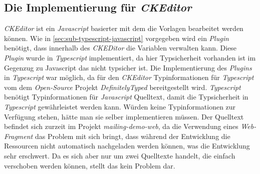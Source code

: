 \subsection{Die Implementierung für \emph{CKEditor}}
\emph{CKEditor} ist ein \emph{Javascript} basierter mit dem die Vorlagen bearbeitet werden können. Wie in \ref{sec:sub-typescript-javascript} vorgegeben wird ein \emph{Plugin} benötigt, dass innerhalb des \emph{CKEDitor} die Variablen verwalten kann. Diese \emph{Plugin} wurde in \emph{Typescript} implementiert, da hier Typsicherheit vorhanden ist im Gegenzug zu Javascript das nicht typsicher ist. Die Implementierung des \emph{Plugins} in \emph{Typescript} war möglich, da für den \emph{CKEditor} Typinformationen für \emph{Typescript} vom dem \emph{Open-Source} Projekt \emph{DefinitelyTyped} bereitgestellt wird. \emph{Typescript} benötigt Typinformationen für \emph{Javascript} Quelltext, damit die Typsicherheit in \emph{Typescript} gewährleistet werden kann. Würden keine Typinformationen zur Verfügung stehen, hätte man sie selber implementieren müssen. 
\newline
\newline
Der Quelltext befindet sich zurzeit im Projekt \emph{mailing-demo-web}, da die Verwendung eines \emph{Web-Fragment} das Problem mit sich bringt, dass während der Entwicklung die Ressourcen nicht automatisch nachgeladen werden können, was die Entwicklung sehr erschwert. Da es sich aber nur um zwei Quelltexte handelt, die einfach verschoben werden können, stellt das kein Problem dar.
 
